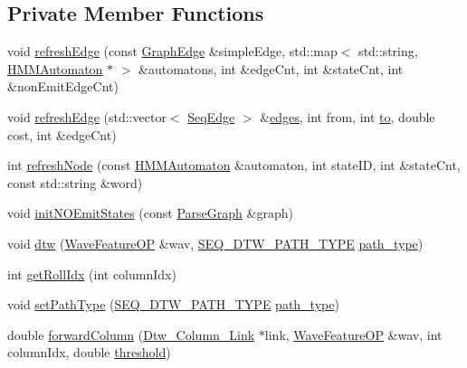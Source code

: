 \subsection*{Private Member Functions}
\begin{DoxyCompactItemize}
\item 
void \hyperlink{class_seq_model_a4a03d96abdd4613da32678d76ae49dc3}{refresh\+Edge} (const \hyperlink{struct_graph_edge}{Graph\+Edge} \&simple\+Edge, std\+::map$<$ std\+::string, \hyperlink{class_h_m_m_automaton}{H\+M\+M\+Automaton} $\ast$ $>$ \&automatons, int \&edge\+Cnt, int \&state\+Cnt, int \&non\+Emit\+Edge\+Cnt)
\item 
void \hyperlink{class_seq_model_abb7d93bff32d26447ec280c229e055aa}{refresh\+Edge} (std\+::vector$<$ \hyperlink{struct_seq_edge}{Seq\+Edge} $>$ \&\hyperlink{class_seq_model_ab293b1600e51e35d49bc33a45f74dd9d}{edges}, int from, int \hyperlink{rastaplp_8m_a41c60bbfbe5db430f286f173be10a1e6}{to}, double cost, int \&edge\+Cnt)
\item 
int \hyperlink{class_seq_model_aeb9f0de9dbfb5bf87ef91252af0c99c8}{refresh\+Node} (const \hyperlink{class_h_m_m_automaton}{H\+M\+M\+Automaton} \&automaton, int state\+I\+D, int \&state\+Cnt, const std\+::string \&word)
\item 
void \hyperlink{class_seq_model_abfc5affef293313a9caaf8f221e6282b}{init\+N\+O\+Emit\+States} (const \hyperlink{class_parse_graph}{Parse\+Graph} \&graph)
\item 
void \hyperlink{class_seq_model_ab783695b9217c3bbc7f930a492a729e8}{dtw} (\hyperlink{class_wave_feature_o_p}{Wave\+Feature\+O\+P} \&wav, \hyperlink{class_seq_model_a145b769692f03811a15c5289fe77da42}{S\+E\+Q\+\_\+\+D\+T\+W\+\_\+\+P\+A\+T\+H\+\_\+\+T\+Y\+P\+E} \hyperlink{class_seq_model_afa1904812bb4a3363960db559983e195}{path\+\_\+type})
\item 
int \hyperlink{class_seq_model_af2e990d1fd01d2a297733afe9bd608dd}{get\+Roll\+Idx} (int column\+Idx)
\item 
void \hyperlink{class_seq_model_a0cc11091ec47eaf08272fa7d8ce7a0ac}{set\+Path\+Type} (\hyperlink{class_seq_model_a145b769692f03811a15c5289fe77da42}{S\+E\+Q\+\_\+\+D\+T\+W\+\_\+\+P\+A\+T\+H\+\_\+\+T\+Y\+P\+E} \hyperlink{class_seq_model_afa1904812bb4a3363960db559983e195}{path\+\_\+type})
\item 
double \hyperlink{class_seq_model_a5bdca555363833c1877b9967206a6289}{forward\+Column} (\hyperlink{struct_dtw___column___link}{Dtw\+\_\+\+Column\+\_\+\+Link} $\ast$link, \hyperlink{class_wave_feature_o_p}{Wave\+Feature\+O\+P} \&wav, int column\+Idx, double \hyperlink{rawdtw_8cpp_afcfbedec6ebde62c6a091ce335836ef1}{threshold})

\end{DoxyCompactItemize}
